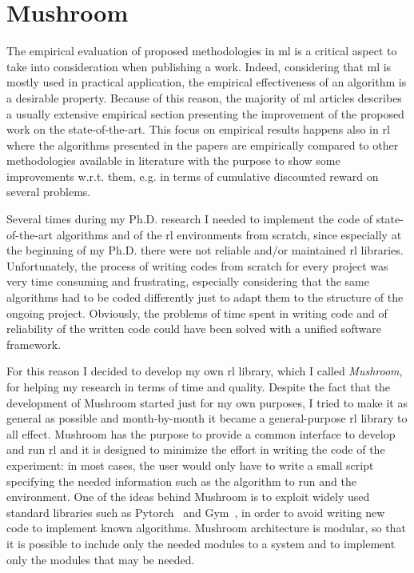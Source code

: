 \chapter{Mushroom}\label{App:msh}
The empirical evaluation of proposed methodologies in \gls{ml} is a critical aspect to take into consideration when publishing a work. Indeed, considering that \gls{ml} is mostly used in practical application, the empirical effectiveness of an algorithm is a desirable property. Because of this reason, the majority of \gls{ml} articles describes a usually extensive empirical section presenting the improvement of the proposed work on the state-of-the-art. This focus on empirical results happens also in \gls{rl} where the algorithms presented in the papers are empirically compared to other methodologies available in literature with the purpose to show some improvements w.r.t. them, e.g. in terms of cumulative discounted reward on several problems.

Several times during my Ph.D. research I needed to implement the code of state-of-the-art algorithms and of the \gls{rl} environments from scratch, since especially at the beginning of my Ph.D. there were not reliable and/or maintained \gls{rl} libraries. Unfortunately, the process of writing codes from scratch for every project was very time consuming and frustrating, especially considering that the same algorithms had to be coded differently just to adapt them to the structure of the ongoing project. Obviously, the problems of time spent in writing code and of reliability of the written code could have been solved with a unified software framework.

For this reason I decided to develop my own \gls{rl} library, which I called \textit{Mushroom}, for helping my research in terms of time and quality. Despite the fact that the development of Mushroom started just for my own purposes, I tried to make it as general as possible and month-by-month it became a general-purpose \gls{rl} library to all effect. Mushroom has the purpose to provide a common interface to develop and run \gls{rl} and it is designed to minimize the effort in writing the code of the experiment: in most cases, the user would only have to write a small script specifying the needed information such as the algorithm to run and the environment. One of the ideas behind Mushroom is to exploit widely used standard libraries such as Pytorch~\cite{paszke2017automatic} and Gym~\cite{gym}, in order to avoid writing new code to implement known algorithms. Mushroom architecture is modular, so that it is possible to include only the needed modules to a system and to implement only the modules that may be needed.

